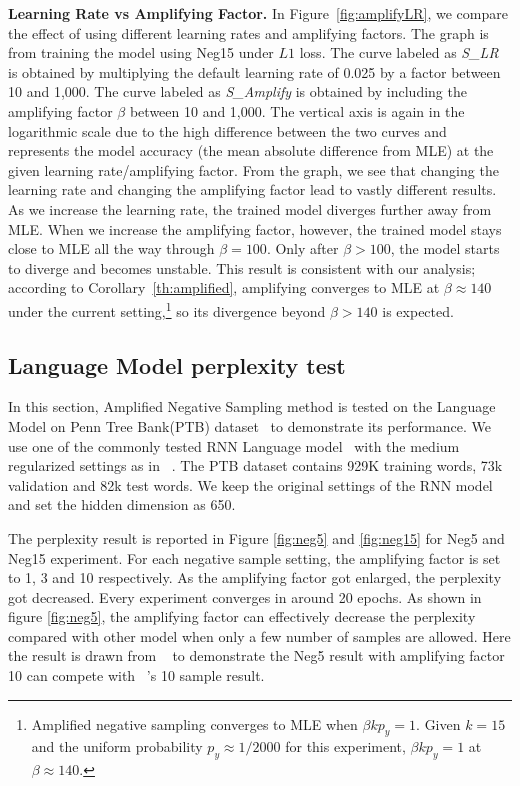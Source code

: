 \textbf{Learning Rate vs Amplifying Factor.} In Figure~\ref{fig:amplifyLR}, we compare the effect of using different learning rates and amplifying factors. The graph is from training the model using Neg15 under $L1$ loss. The curve labeled as \emph{S\_LR} is obtained by multiplying the default learning rate of 0.025 by a factor between 10 and 1,000. The curve labeled as \emph{S\_Amplify} is obtained by including the amplifying factor $\beta$ between 10 and 1,000. The vertical axis is again in the logarithmic scale due to the high difference between the two curves and represents the model accuracy (the mean absolute difference from MLE) at the given learning rate/amplifying factor. From the graph, we see that changing the learning rate and changing the amplifying factor lead to vastly different results. As we increase the learning rate, the trained model diverges further away from MLE. When we increase the amplifying factor, however, the trained model stays close to MLE all the way through $\beta = 100$. Only after $\beta > 100$, the model starts to diverge and becomes unstable. This result is consistent with our analysis; according to Corollary~\ref{th:amplified}, amplifying converges to MLE at $\beta \approx 140$ under the current setting,\footnote{Amplified negative sampling converges to MLE when $\beta k p_y = 1$. Given $k=15$ and the uniform probability $p_y \approx 1/2000$ for this experiment, $\beta k p_y = 1$ at $\beta \approx 140$.} so its divergence beyond $\beta > 140$ is expected.

\subsection{Language Model perplexity test}
In this section, Amplified Negative Sampling method is tested on the Language Model on Penn Tree Bank(PTB) dataset~\citep{marcus-etal-1993-building} to demonstrate its performance. We use one of the commonly tested RNN Language model~\citep{zaremba2014recurrent} with the medium regularized settings as in ~\citep{blanc2017adaptive}. The PTB dataset contains 929K training words, 73k validation and 82k test words. We keep the original settings of the RNN model and set the hidden dimension as 650.

The perplexity result is reported in Figure \ref{fig:neg5} and \ref{fig:neg15} for Neg5 and Neg15 experiment. For each negative sample setting, the amplifying factor is set to 1, 3 and 10 respectively. As the amplifying factor got enlarged, the perplexity got decreased. Every experiment converges in around 20 epochs.
As shown in figure \ref{fig:neg5}, the amplifying factor can effectively decrease the perplexity compared with other model when only a few number of samples are allowed. Here the result is drawn from ~\citep{blanc2017adaptive} to demonstrate the Neg5 result with amplifying factor 10 can compete with ~\citep{blanc2017adaptive}'s 10 sample result.

